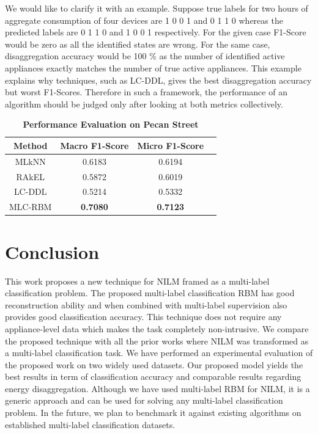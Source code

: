 \documentclass{article}
\begin{document}
We would like to clarify it with an example. Suppose true labels for two hours of aggregate consumption of four devices are 1 0 0 1 and  0 1 1 0 whereas the predicted labels are  0 1 1 0 and 1 0 0 1 respectively. For the given case F1-Score would be zero as all the identified states are wrong. For the same case, disaggregation accuracy would be 100 \% as the number of identified active appliances exactly matches the number of true active appliances. This example explains why techniques, such as LC-DDL, gives the best disaggregation accuracy but worst F1-Scores. Therefore in such a framework, the performance of an algorithm should be judged only after looking at both metrics collectively.


\begin{table}
\begin{center}
\caption {\textbf{Performance Evaluation on Pecan Street}}
\label{tab4}
\begin{tabular}{c c c c}
\toprule[0.2mm]
\textbf{Method}    & \textbf{Macro F1-Score} &\textbf{ Micro F1-Score} \\
    \midrule
     MLkNN              &  0.6183          &  0.6194                    \\
     
     RAkEL              &  0.5872          &  0.6019                     \\
    
     LC-DDL             &  0.5214          &  0.5332                   \\
    
     MLC-RBM        &\textbf{0.7080}   &\textbf{0.7123}          \\
    \bottomrule[0.2mm]
\end{tabular}
\end{center}
\end{table}

\section{Conclusion}
This work proposes a new technique for NILM framed as a multi-label classification problem. The proposed multi-label classification RBM has good reconstruction ability and when combined with multi-label supervision also provides good classification accuracy. This technique does not require any appliance-level data which makes the task completely non-intrusive. We compare the proposed technique with all the prior works where NILM was transformed as a multi-label classification task. We have performed an experimental evaluation of the proposed work on two widely used datasets. Our proposed model yields the best results in term of classification accuracy and comparable results regarding energy disaggregation. Although we have used multi-label RBM for NILM, it is a generic approach and can be used for solving any multi-label classification problem. In the future, we plan to benchmark it against existing algorithms on established multi-label classification datasets. 
\end{document}
